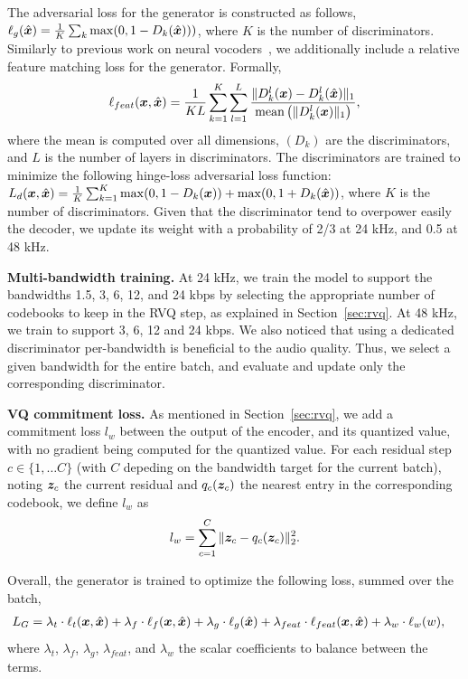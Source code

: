 The adversarial loss for the generator is constructed as follows, $\ell_{g}(\hat{\bm{x}}) = \frac{1}{K} \sum_{k} \max(0, 1 - D_k(\hat{\bm{x}})))$, where $K$ is the number of discriminators.
Similarly to previous work on neural vocoders~\citep{melgan, hifigan, you2021gan}, we additionally include a relative feature matching loss for the generator. Formally, 
\begin{equation}
    \ell_{feat}(\bm{x}, \hat{\bm{x}}) = \frac{1}{KL} \sum_{k=1}^{K}\sum_{l=1}^{L} \frac{\| D_{k}^{l}(\bm{x}) - D_{k}^{l}(\hat{\bm{x}}) \|_1}{\mathrm{mean}\left(\|D_{k}^{l}(\bm{x}) \|_1\right)},
    \label{eq:feat}
\end{equation}
where the $\mathrm{mean}$ is computed over all dimensions,
$(D_k)$ are the discriminators, and $L$ is the number of layers in discriminators.
The discriminators are trained to minimize the following hinge-loss adversarial loss function: $L_{d}(\bm{x}, \hat{\bm{x}}) = \frac{1}{K} \sum_{k=1}^{K} \max(0, 1 - D_k(\bm{x})) + \max(0, 1 + D_k(\hat{\bm{x}}))$, where $K$ is the number of discriminators. Given that the discriminator tend to overpower easily the decoder, we update its weight
with a probability of 2/3 at 24 kHz, and 0.5 at 48 kHz.

{\noindent \bf Multi-bandwidth training.}
At 24 kHz, we train the model to support the bandwidths 1.5, 3, 6, 12, and 24 kbps by selecting the appropriate
number of codebooks to keep in the RVQ step, as explained in Section~\ref{sec:rvq}. At 48 kHz, we 
train to support 3, 6, 12 and 24 kbps. We also noticed that using a dedicated discriminator per-bandwidth
is beneficial to the audio quality. Thus, we select a given bandwidth for the entire batch, and evaluate
and update only the corresponding discriminator.

{\noindent \bf VQ commitment loss.}
As mentioned in Section~\ref{sec:rvq}, we add a commitment loss $l_w$ between the output of the encoder,
and its quantized value, with no gradient being computed for the quantized value.
For each residual step $c \in \{1, \ldots C\}$ (with $C$ depeding on the bandwidth target for the current batch), noting $\bm{z}_c$ the current residual and $q_c(\bm{z}_c)$ the nearest entry in the corresponding codebook, we define $l_w$ as
\begin{equation}
    l_w = \sum_{c=1}^{C} \| \bm{z}_c - q_c(\bm{z}_c)\|_2^2.
\end{equation}

Overall, the generator is trained to optimize the following loss, summed over the batch,
\begin{equation}
\label{eq:total_loss}
    \begin{split}
   &L_{G} = \lambda_t\cdot\ell_{t}(\bm{x}, \hat{\bm{x}}) + \lambda_f\cdot\ell_{f}(\bm{x}, \hat{\bm{x}}) + \lambda_g\cdot\ell_{g}(\hat{\bm{x}}) + \lambda_{feat}\cdot\ell_{feat}(\bm{x}, \hat{\bm{x}}) + \lambda_w \cdot\ell_w(w),
    \end{split}
\end{equation}
where $\lambda_t$, $\lambda_f$, $\lambda_g$, $\lambda_{feat}$, and $\lambda_w$ the scalar coefficients to balance between the terms.


